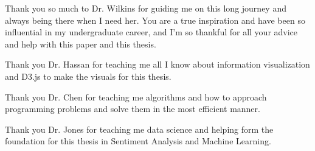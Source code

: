 Thank you so much to Dr. Wilkins for guiding me on this long journey and always being there when I need her. You are a true inspiration and have been so influential in my undergraduate career, and I'm so thankful for all your advice and help with this paper and this thesis.

Thank you Dr. Hassan for teaching me all I know about information visualization and D3.js to make the visuals for this thesis.

Thank you Dr. Chen for teaching me algorithms and how to approach programming problems and solve them in the most efficient manner.

Thank you Dr. Jones for teaching me data science and helping form the foundation for this thesis in Sentiment Analysis and Machine Learning.